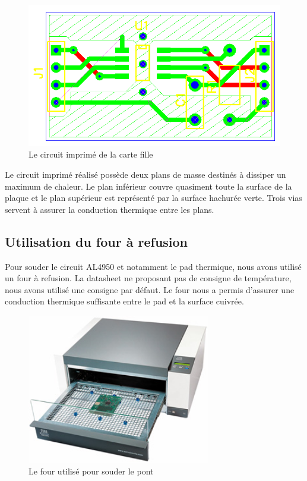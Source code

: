 \documentclass[11pt, french]{article} %
\begin{document}
\begin{figure}[h!]
	\centering
	\includegraphics[width = 15cm]{SolutionAnalogique/Layout.png}
	\caption{Le circuit imprimé de la carte fille}
\end{figure}
Le circuit imprimé réalisé possède deux plans de masse destinés à dissiper un maximum de chaleur. Le plan inférieur couvre quasiment toute la surface de la plaque et le plan supérieur est représenté par la surface hachurée verte. Trois vias servent à assurer la conduction thermique entre les plans.

\subsection{Utilisation du four à refusion}

Pour souder le circuit AL4950 et notamment le pad thermique, nous avons utilisé un four à refusion. La datasheet ne proposant pas de consigne de température, nous avons utilisé une consigne par défaut. Le four nous a permis d'assurer une conduction thermique suffisante entre le pad et la surface cuivrée.

\begin{figure}[h!]
	\centering
	\includegraphics[width = 8cm]{SolutionAnalogique/fourarefusion.jpg}
	\caption{Le four utilisé pour souder le pont}
\end{figure}
\end{document}

